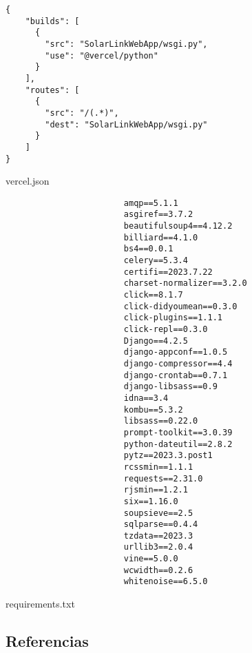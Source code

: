 \begin{listing}[H]
\begin{verbatim}
{
    "builds": [
      {
        "src": "SolarLinkWebApp/wsgi.py",
        "use": "@vercel/python"
      }
    ],
    "routes": [
      {
        "src": "/(.*)",
        "dest": "SolarLinkWebApp/wsgi.py"
      }
    ]
}
\end{verbatim}
\caption{vercel.json}
\label{vercel.json}
\end{listing}

\begin{listing}[H]
\begin{verbatim}
                        amqp==5.1.1
                        asgiref==3.7.2
                        beautifulsoup4==4.12.2
                        billiard==4.1.0
                        bs4==0.0.1
                        celery==5.3.4
                        certifi==2023.7.22
                        charset-normalizer==3.2.0
                        click==8.1.7
                        click-didyoumean==0.3.0
                        click-plugins==1.1.1
                        click-repl==0.3.0
                        Django==4.2.5
                        django-appconf==1.0.5
                        django-compressor==4.4
                        django-crontab==0.7.1
                        django-libsass==0.9
                        idna==3.4
                        kombu==5.3.2
                        libsass==0.22.0
                        prompt-toolkit==3.0.39
                        python-dateutil==2.8.2
                        pytz==2023.3.post1
                        rcssmin==1.1.1
                        requests==2.31.0
                        rjsmin==1.2.1
                        six==1.16.0
                        soupsieve==2.5
                        sqlparse==0.4.4
                        tzdata==2023.3
                        urllib3==2.0.4
                        vine==5.0.0
                        wcwidth==0.2.6
                        whitenoise==6.5.0
\end{verbatim}
\caption{requirements.txt}
\label{requirements.txt}
\end{listing}

\clearpage

\subsection{Referencias}

